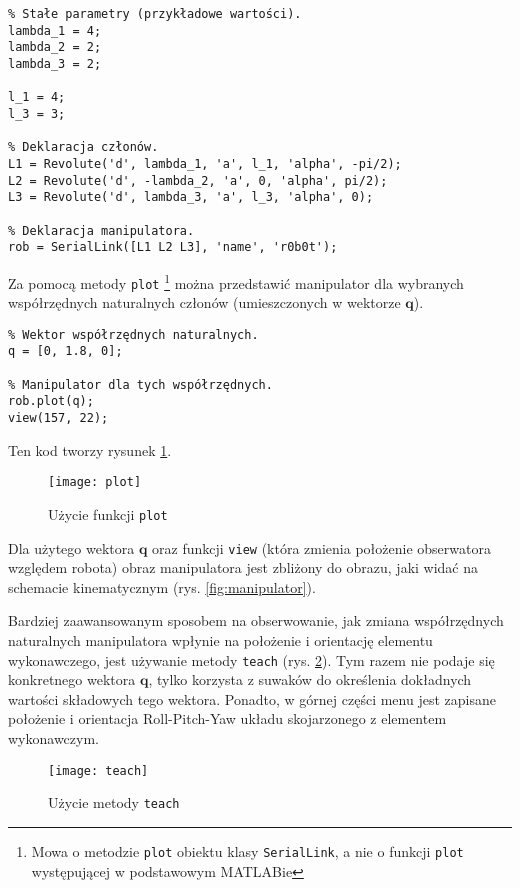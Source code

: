\documentclass[11pt, a4paper]{article}
\begin{document}
\begin{lstlisting}
% Stałe parametry (przykładowe wartości).
lambda_1 = 4;
lambda_2 = 2;
lambda_3 = 2;

l_1 = 4;
l_3 = 3;

% Deklaracja członów.
L1 = Revolute('d', lambda_1, 'a', l_1, 'alpha', -pi/2);
L2 = Revolute('d', -lambda_2, 'a', 0, 'alpha', pi/2);
L3 = Revolute('d', lambda_3, 'a', l_3, 'alpha', 0);

% Deklaracja manipulatora.
rob = SerialLink([L1 L2 L3], 'name', 'r0b0t');
\end{lstlisting}

Za pomocą metody \texttt{plot}%
\footnote{Mowa o metodzie \texttt{plot} obiektu klasy \texttt{SerialLink}, a nie o funkcji \texttt{plot} występującej w podstawowym MATLABie}
można przedstawić manipulator dla wybranych współrzędnych naturalnych członów (umieszczonych w wektorze $\mathbf{q}$).
\begin{lstlisting}
% Wektor współrzędnych naturalnych.
q = [0, 1.8, 0];

% Manipulator dla tych współrzędnych.
rob.plot(q);
view(157, 22);
\end{lstlisting}

Ten kod tworzy rysunek \ref{fig:plot}.
\begin{figure}[htbp!]
	\centering
	\texttt{[image: plot]}
	\caption{Użycie funkcji \texttt{plot} \label{fig:plot}}
\end{figure}

Dla użytego wektora $\mathbf{q}$ oraz funkcji \texttt{view} (która zmienia położenie obserwatora względem robota) obraz manipulatora jest zbliżony do obrazu, jaki widać na schemacie kinematycznym (rys. \ref{fig:manipulator}).

Bardziej zaawansowanym sposobem na obserwowanie, jak zmiana współrzędnych naturalnych manipulatora wpłynie na położenie i orientację elementu wykonawczego, jest używanie metody \texttt{teach} (rys. \ref{fig:teach}). Tym razem nie podaje się konkretnego wektora $\mathbf{q}$, tylko korzysta z suwaków do określenia dokładnych wartości składowych tego wektora. Ponadto, w górnej części menu jest zapisane położenie i orientacja Roll-Pitch-Yaw układu skojarzonego z elementem wykonawczym.
\begin{figure}[htbp!]
	\centering
	\texttt{[image: teach]}
	\caption{Użycie metody \texttt{teach} \label{fig:teach}}
\end{figure}
\end{document}
